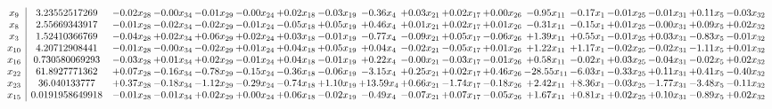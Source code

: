 \documentclass[9pt]{article}
\begin{document}
 \[\begin{array}{c| c c@{\hskip 2pt} c@{\hskip 2pt} c@{\hskip 2pt} c@{\hskip 2pt} c@{\hskip 2pt} c@{\hskip 2pt} c@{\hskip 2pt} c@{\hskip 2pt} c@{\hskip 2pt} c@{\hskip 2pt} c@{\hskip 2pt} c@{\hskip 2pt} c@{\hskip 2pt} c@{\hskip 2pt} c@{\hskip 2pt} c@{\hskip 2pt} }
 x_{9}   &  3.23552517269 & -0.02 x_{28} & -0.00 x_{34} & -0.01 x_{29} & -0.00 x_{24} & +  0.02 x_{18} & -0.03 x_{19} & -0.36 x_{4} & +  0.03 x_{21} & +  0.02 x_{17} & +  0.00 x_{26} & -0.95 x_{11} & -0.17 x_{1} & -0.01 x_{25} & -0.01 x_{31} & +  0.11 x_{5} & -0.03 x_{32}\\
 x_{8}   &  2.55669343917 & -0.01 x_{28} & -0.02 x_{34} & -0.02 x_{29} & -0.01 x_{24} & -0.05 x_{18} & +  0.05 x_{19} & +  0.46 x_{4} & +  0.01 x_{21} & +  0.02 x_{17} & +  0.01 x_{26} & -0.31 x_{11} & -0.15 x_{1} & +  0.01 x_{25} & -0.00 x_{31} & +  0.09 x_{5} & +  0.02 x_{32}\\
 x_{3}   &  1.52410366769 & -0.04 x_{28} & +  0.02 x_{34} & +  0.06 x_{29} & +  0.02 x_{24} & +  0.03 x_{18} & -0.01 x_{19} & -0.77 x_{4} & -0.09 x_{21} & +  0.05 x_{17} & -0.06 x_{26} & +  1.39 x_{11} & +  0.55 x_{1} & -0.01 x_{25} & +  0.03 x_{31} & -0.83 x_{5} & -0.01 x_{32}\\
 x_{10}   &  4.20712908441 & -0.01 x_{28} & -0.00 x_{34} & -0.02 x_{29} & +  0.01 x_{24} & +  0.04 x_{18} & +  0.05 x_{19} & +  0.04 x_{4} & -0.02 x_{21} & -0.05 x_{17} & +  0.01 x_{26} & +  1.22 x_{11} & +  1.17 x_{1} & -0.02 x_{25} & -0.02 x_{31} & -1.11 x_{5} & +  0.01 x_{32}\\
 x_{16}   &  0.730580069293 & -0.03 x_{28} & +  0.01 x_{34} & +  0.02 x_{29} & -0.01 x_{24} & +  0.04 x_{18} & -0.01 x_{19} & +  0.22 x_{4} & -0.00 x_{21} & -0.03 x_{17} & -0.01 x_{26} & +  0.58 x_{11} & -0.02 x_{1} & +  0.03 x_{25} & -0.04 x_{31} & -0.02 x_{5} & +  0.02 x_{32}\\
 x_{22}   &  61.8927771362 & +  0.07 x_{28} & -0.16 x_{34} & -0.78 x_{29} & -0.15 x_{24} & -0.36 x_{18} & -0.06 x_{19} & -3.15 x_{4} & +  0.25 x_{21} & +  0.02 x_{17} & +  0.46 x_{26} & -28.55 x_{11} & -6.03 x_{1} & -0.33 x_{25} & +  0.11 x_{31} & +  0.41 x_{5} & -0.40 x_{32}\\
 x_{23}   &  36.040133777 & +  0.37 x_{28} & -0.18 x_{34} & -1.12 x_{29} & -0.29 x_{24} & -0.74 x_{18} & +  1.10 x_{19} & + 13.59 x_{4} & +  0.66 x_{21} & -1.74 x_{17} & -0.18 x_{26} & +  2.42 x_{11} & +  8.36 x_{1} & -0.03 x_{25} & -1.77 x_{31} & -3.48 x_{5} & -0.11 x_{32}\\
 x_{15}   &  0.0191958649918 & -0.01 x_{28} & -0.01 x_{34} & +  0.02 x_{29} & +  0.00 x_{24} & +  0.06 x_{18} & -0.02 x_{19} & -0.49 x_{4} & -0.07 x_{21} & +  0.07 x_{17} & -0.05 x_{26} & +  1.67 x_{11} & +  0.81 x_{1} & +  0.02 x_{25} & +  0.10 x_{31} & -0.89 x_{5} & +  0.02 x_{32}\\

\end{array}\]
\end{document}
